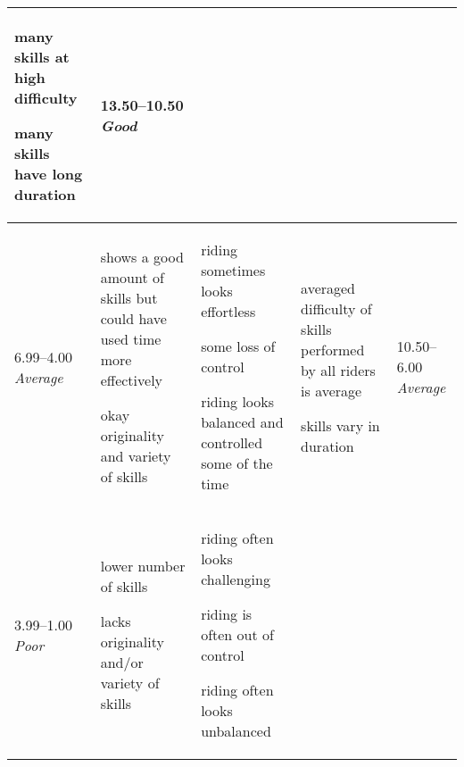 \begin{minipage}{\textwidth}
\begin{longtable}{|p{1.5cm}|p{5cm}|p{5cm}|p{5cm}|p{1.5cm}|}
\begin{judging_items}%
\item many skills at high difficulty
\item many skills have long duration
\end{judging_items} &

13.50--10.50 \newline
\emph{Good} \\
\hline

6.99--4.00 \newline
\emph{Average} &

\begin{judging_items}%
\item shows a good amount of skills but could have used time more effectively
\item okay originality and variety of skills
\end{judging_items} &

\begin{judging_items}%
\item riding sometimes looks effortless
\item some loss of control
\item riding looks balanced and controlled some of the time
\end{judging_items} &

\begin{judging_items}%
\item averaged difficulty of skills performed by all riders is average
\item skills vary in duration
\end{judging_items} &

10.50--6.00 \newline
\emph{Average} \\
\hline

3.99--1.00 \newline
\emph{Poor} &

\begin{judging_items}%
\item lower number of skills
\item lacks originality and/or variety of skills
\end{judging_items} &

\begin{judging_items}%
\item riding often looks challenging
\item riding is often out of control
\item riding often looks unbalanced
\end{judging_items} &


\end{longtable}
\end{minipage}
